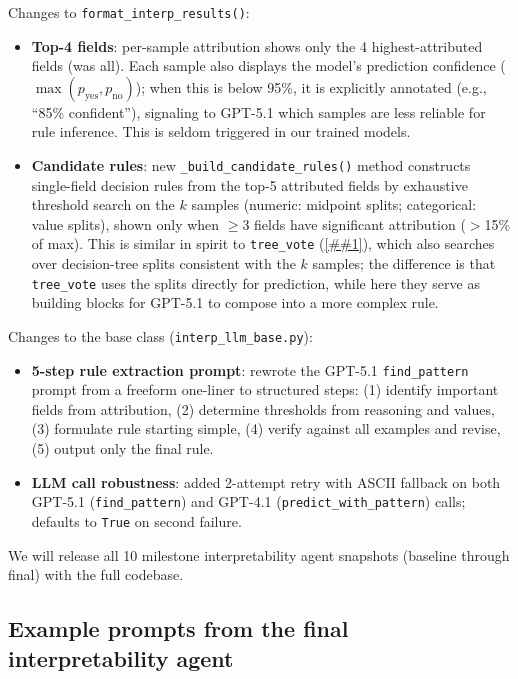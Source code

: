 \documentclass{article} %
\newcommand{\Cref}[1]{\ref{##1}}
\begin{document}
Changes to \texttt{format\_interp\_results()}:
\begin{itemize}[nosep,leftmargin=*]
    \item \textbf{Top-4 fields}: per-sample attribution shows only the 4 highest-attributed fields (was all). Each sample also displays the model's prediction confidence ($\max(p_\text{yes}, p_\text{no})$); when this is below 95\%, it is explicitly annotated (e.g., ``85\% confident''), signaling to GPT-5.1 which samples are less reliable for rule inference. This is seldom triggered in our trained models.
    \item \textbf{Candidate rules}: new \texttt{\_build\_candidate\_rules()} method constructs single-field decision rules from the top-5 attributed fields by exhaustive threshold search on the $k$ samples (numeric: midpoint splits; categorical: value splits), shown only when $\geq$3 fields have significant attribution ($>$15\% of max). This is similar in spirit to \texttt{tree\_vote} (\Cref{app:tree_voting}), which also searches over decision-tree splits consistent with the $k$ samples; the difference is that \texttt{tree\_vote} uses the splits directly for prediction, while here they serve as building blocks for GPT-5.1 to compose into a more complex rule.
\end{itemize}

Changes to the base class (\texttt{interp\_llm\_base.py}):
\begin{itemize}[nosep,leftmargin=*]
    \item \textbf{5-step rule extraction prompt}: rewrote the GPT-5.1 \texttt{find\_pattern} prompt from a freeform one-liner to structured steps: (1) identify important fields from attribution, (2) determine thresholds from reasoning and values, (3) formulate rule starting simple, (4) verify against all examples and revise, (5) output only the final rule.
    \item \textbf{LLM call robustness}: added 2-attempt retry with ASCII fallback on both GPT-5.1 (\texttt{find\_pattern}) and GPT-4.1 (\texttt{predict\_with\_pattern}) calls; defaults to \texttt{True} on second failure.
\end{itemize}

We will release all 10 milestone interpretability agent snapshots (baseline through final) with the full codebase.

\subsection{Example prompts from the final interpretability agent}
\end{document}
